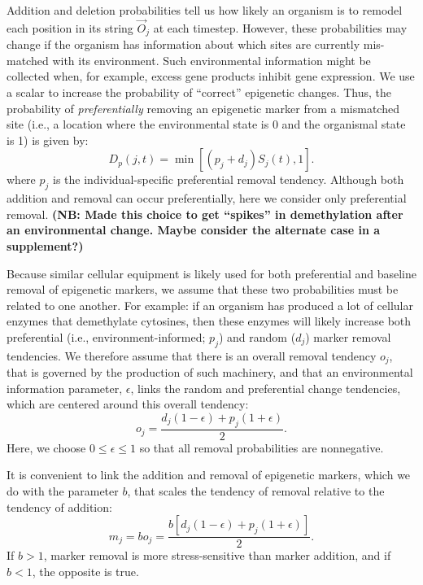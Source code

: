 \documentclass{article}
\begin{document}
Addition and deletion probabilities tell us how likely an organism is to remodel each position in its string $\vec{O}_j$ at each timestep. However, these probabilities may change if the organism has information about which sites are currently mis-matched with its environment. Such environmental information might be collected when, for example, excess gene products inhibit gene expression. %
We use a scalar to increase the probability of ``correct'' epigenetic changes. Thus, the probability of \textit{preferentially} removing an epigenetic marker from a mismatched site (i.e., a location where the environmental state is 0 and the organismal state is 1) is given by:
\begin{equation}
    D_p(j,t) = \min\left[(p_j+d_j)S_j(t),1\right].
\end{equation}
where $p_j$ is the individual-specific preferential removal tendency. Although both addition and removal can occur preferentially, here we consider only preferential removal. \textbf{(NB: Made this choice to get ``spikes'' in demethylation after an environmental change. Maybe consider the alternate case in a supplement?)}

Because similar cellular equipment is likely used for both preferential and baseline removal of epigenetic markers, we assume that these two probabilities must be related to one another. For example: if an organism has produced a lot of cellular enzymes that demethylate cytosines, then these enzymes will likely increase both preferential (i.e., environment-informed; $p_j$) and random ($d_j$) marker removal tendencies. We therefore assume that there is an overall removal tendency $o_j$, that is governed by the production of such machinery, and that an environmental information parameter, $\epsilon$, links the random and preferential change tendencies, which are centered around this overall tendency:
\begin{equation}
    o_j = \frac{ d_j\left( 1 - \epsilon \right) + p_j \left( 1+ \epsilon \right) }{2}.
\end{equation}
Here, we choose $0 \leq \epsilon \leq 1$ so that all removal probabilities are nonnegative.

It is convenient to link the addition and removal of epigenetic markers, which we do with the parameter $b$, that scales the tendency of removal relative to the tendency of addition:
\begin{equation}
    m_j = b o_j = \frac{b\left[ d_j\left( 1 - \epsilon \right) + p_j \left( 1+ \epsilon \right) \right]}{2}.
\end{equation}
If $b > 1$, marker removal is more stress-sensitive than marker addition, and if $b < 1$, the opposite is true.
\end{document}
